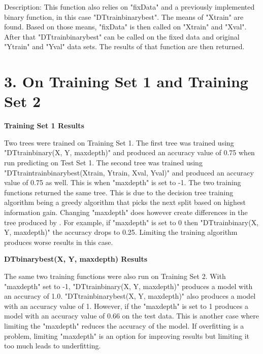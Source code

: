 \documentclass{article}
\begin{document}
\indent Description: This function also relies on "fixData" and a previously implemented binary function, in this case "DT\textunderscore train\textunderscore binary\textunderscore best". The means of "X\textunderscore train" are found. Based on those means, "fixData" is then called on "X\textunderscore train" and "X\textunderscore val". After that "DT\textunderscore train\textunderscore binary\textunderscore best" can be called on the fixed data and original "Y\textunderscore train" and "Y\textunderscore val" data sets. The results of that function are then returned.

\section*{3. On Training Set 1 and Training Set 2}

\noindent \textbf{Training Set 1 Results}

\indent Two trees were trained on Training Set 1. The first tree was trained using "DT\textunderscore train\textunderscore binary(X, Y, max\textunderscore depth)" and produced an accuracy value of 0.75 when run predicting on Test Set 1. The second tree was trained using "DT\textunderscore train\textunderscore train\textunderscore binary\textunderscore best(X\textunderscore train, Y\textunderscore train, X\textunderscore val, Y\textunderscore val)" and produced an accuracy value of 0.75 as well. This is when "max\textunderscore depth" is set to -1. The two training functions returned the same tree. This is due to the decision tree training algorithm being a greedy algorithm that picks the next split based on highest information gain. Changing "max\textunderscore depth" does however create differences in the tree produced by . For example, if "max\textunderscore depth" is set to 0 then "DT\textunderscore train\textunderscore binary(X, Y, max\textunderscore depth)" the accuracy drops to 0.25. Limiting the training algorithm produces worse results in this case.

\noindent \textbf{DT\textunderscore binary\textunderscore  best(X, Y, max\textunderscore depth) Results}

\indent The same two training functions were also run on Training Set 2. With "max\textunderscore depth" set to -1, "DT\textunderscore train\textunderscore binary(X, Y, max\textunderscore depth)" produces a model with an accuracy of 1.0. "DT\textunderscore train\textunderscore binary\textunderscore best(X, Y, max\textunderscore depth)" also produces a model with an accuracy value of 1. However, if the "max\textunderscore depth" is set to 1 produces a model with an accuracy value of 0.66 on the test data. This is another case where limiting the "max\textunderscore depth" reduces the accuracy of the model. If overfitting is a problem, limiting "max\textunderscore depth" is an option for improving results but limiting it too much leads to underfitting. 
\end{document}
